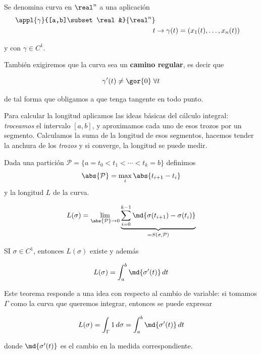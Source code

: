\begin{defn}[Curva\IS $C^1$]  Se denomina curva en $\real^n$ a una aplicación \begin{align*}
\appl{\gamma}{[a,b]\subset \real&}{\real^n} \\
t&\to \gamma(t) = (x_1(t),\dotsc,x_n(t))
\end{align*}

y con $\gamma\in C^1$.

También exigiremos que la curva sea un \textbf{camino regular}, es decir que

\[ \gamma'(t) \neq \gor{0} \;\forall t \]

de tal forma que obligamos a que tenga tangente en todo punto.
\end{defn}

Para calcular la longitud aplicamos las ideas básicas del cálculo integral: \textit{troceamos} el intervalo $[a,b]$, y aproximamos cada uno de esos trozos por un segmento. Calculamos la suma de la longitud de esos segmentos, hacemos tender la anchura de los \textit{trozos} y si converge, la longitud se puede medir.

\begin{theorem} Dada una partición $\mathcal{P} = \{ a= t_0 < t_1 < \dotsb < t_k = b\}$ definimos \[ \abs{\mathcal{P}} = \max_i \abs{t_{i+1} - t_i} \] y la longitud $L$ de la curva.

\[ L(\sigma) = \lim_{\abs{\mathcal{P}}\to 0} \underbrace{\sum_{i=0}^{k-1} \md{\sigma(t_{i+1}) - \sigma(t_i)}}_{=S(\sigma,\mathcal{P})} \]

SI $\sigma\in C^1$, entonces $L(\sigma)$ existe y además

\[ L(\sigma) = \int_a^b \md{\sigma'(t)}\,dt \]

\end{theorem}

Este teorema responde a una idea con respecto al cambio de variable: si tomamos $\Gamma$ como la curva que queremos integrar, entonces se puede expresar

\[ L(\sigma) = \int_\Gamma 1\,d\sigma = \int_a^b \md{\sigma'(t)}\,dt  \]

donde $\md{\sigma'(t)}$ es el cambio en la medida correspondiente.

